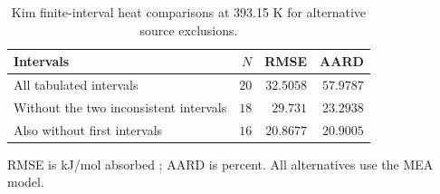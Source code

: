 \begin{table}[!htbp]\small\setlength{\tabcolsep}{3pt}\centering
\caption{Kim finite-interval heat comparisons at 393.15 K for alternative source exclusions.}\label{tab:kim-alternatives}
\begin{tabular}{@{}lrrr@{}}
\toprule
Intervals & $N$ & RMSE & AARD \\
\midrule
All tabulated intervals & $20$ & $32.5058$ & $57.9787$ \\
Without the two inconsistent intervals & $18$ & $29.731$ & $23.2938$ \\
Also without first intervals & $16$ & $20.8677$ & $20.9005$ \\
\bottomrule
\end{tabular}
\par\smallskip\parbox{\linewidth}{\footnotesize\raggedright RMSE is kJ/mol absorbed ; AARD is percent. All alternatives use the MEA model.}
\end{table}
